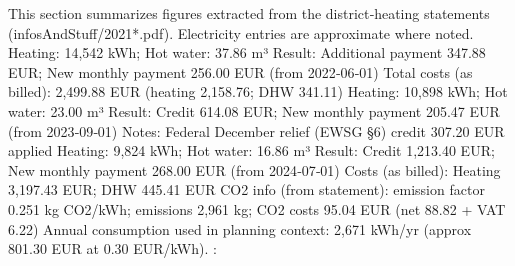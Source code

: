 \markdownRendererDocumentBegin
This section summarizes figures extracted from the district‑heating statements (infosAndStuff/2021*.pdf). Electricity entries are approximate where noted.\markdownRendererInterblockSeparator
{}\markdownRendererSectionBegin
\markdownRendererSectionBegin
{}\markdownRendererInterblockSeparator
{}\markdownRendererUlBeginTight
{}\markdownRendererUlItemEnd 
\markdownRendererUlItem Heating: 14,542 kWh; Hot water: 37.86 m³\markdownRendererUlItemEnd 
\markdownRendererUlItem Result: Additional payment 347.88 EUR; New monthly payment 256.00 EUR (from 2022‑06‑01)\markdownRendererUlItemEnd 
\markdownRendererUlItem Total costs (as billed): 2,499.88 EUR (heating 2,158.76; DHW 341.11)\markdownRendererUlItemEnd 
{}\markdownRendererUlItemEnd 
\markdownRendererUlItem Heating: 10,898 kWh; Hot water: 23.00 m³\markdownRendererUlItemEnd 
\markdownRendererUlItem Result: Credit 614.08 EUR; New monthly payment 205.47 EUR (from 2023‑09‑01)\markdownRendererUlItemEnd 
\markdownRendererUlItem Notes: Federal December relief (EWSG §6) credit 307.20 EUR applied\markdownRendererUlItemEnd 
{}\markdownRendererUlItemEnd 
\markdownRendererUlItem Heating: 9,824 kWh; Hot water: 16.86 m³\markdownRendererUlItemEnd 
\markdownRendererUlItem Result: Credit 1,213.40 EUR; New monthly payment 268.00 EUR (from 2024‑07‑01)\markdownRendererUlItemEnd 
\markdownRendererUlItem Costs (as billed): Heating 3,197.43 EUR; DHW 445.41 EUR\markdownRendererUlItemEnd 
\markdownRendererUlItem CO2 info (from statement): emission factor 0.251 kg CO2/kWh; emissions 2,961 kg; CO2 costs 95.04 EUR (net 88.82 + VAT 6.22)\markdownRendererUlItemEnd 
\markdownRendererUlEndTight \markdownRendererInterblockSeparator
{}
\markdownRendererSectionEnd \markdownRendererSectionBegin
{}\markdownRendererInterblockSeparator
{}\markdownRendererUlBeginTight
\markdownRendererUlItem Annual consumption used in planning context: 2,671 kWh/yr (approx 801.30 EUR at 0.30 EUR/kWh).\markdownRendererUlItemEnd 
\markdownRendererUlEndTight \markdownRendererInterblockSeparator
{}
\markdownRendererSectionEnd \markdownRendererSectionBegin
{}\markdownRendererInterblockSeparator
{}\markdownRendererUlBeginTight
{}: \markdownRendererUlItemEnd 

